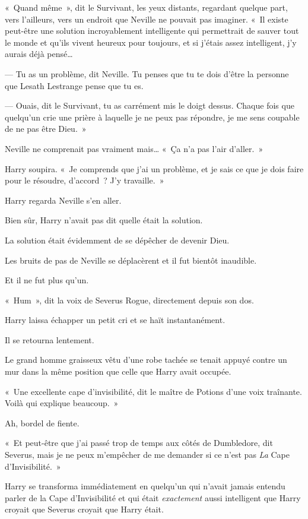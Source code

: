 «~Quand même~», dit le Survivant, les yeux distants, regardant quelque part, vers l'ailleurs, vers un endroit que Neville ne pouvait pas imaginer. «~Il existe peut-être une solution incroyablement intelligente qui permettrait de sauver tout le monde et qu'ils vivent heureux pour toujours, et si j'étais assez intelligent, j'y aurais déjà pensé…

--- Tu as un problème, dit Neville. Tu penses que tu te dois d'être la personne que Lesath Lestrange pense que tu es.

--- Ouais, dit le Survivant, tu as carrément mis le doigt dessus. Chaque fois que quelqu'un crie une prière à laquelle je ne peux pas répondre, je me sens coupable de ne pas être Dieu.~»

Neville ne comprenait pas vraiment mais… «~Ça n'a pas l'air d'aller.~»

Harry soupira. «~Je comprends que j'ai un problème, et je sais ce que je dois faire pour le résoudre, d'accord~? J'y travaille.~»

\later

Harry regarda Neville s'en aller.

Bien sûr, Harry n'avait pas dit quelle était la solution.

La solution était évidemment de se dépêcher de devenir Dieu.

Les bruits de pas de Neville se déplacèrent et il fut bientôt inaudible.

Et il ne fut plus qu'un.

«~Hum~», dit la voix de Severus Rogue, directement depuis son dos.

Harry laissa échapper un petit cri et se haït instantanément.

Il se retourna lentement.

Le grand homme graisseux vêtu d’une robe tachée se tenait appuyé contre un mur dans la même position que celle que Harry avait occupée.

«~Une excellente cape d'invisibilité, dit le maître de Potions d'une voix traînante. Voilà qui explique beaucoup.~»

Ah, bordel de fiente.

«~Et peut-être que j'ai passé trop de temps aux côtés de Dumbledore, dit Severus, mais je ne peux m'empêcher de me demander si ce n'est pas \emph{La} Cape d'Invisibilité.~»

Harry se transforma immédiatement en quelqu'un qui n'avait jamais entendu parler de la Cape d'Invisibilité et qui était \emph{exactement} aussi intelligent que Harry croyait que Severus croyait que Harry était.

